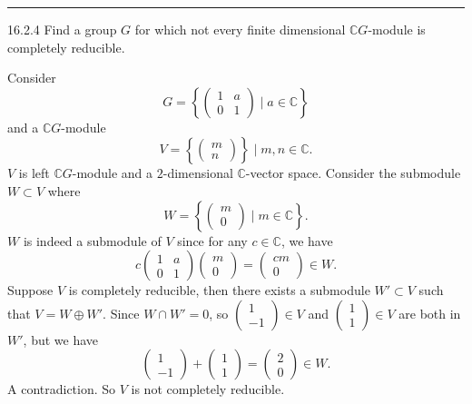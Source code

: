 \documentclass[a4paper, 12pt]{article}
\begin{document}
\noindent\rule{7in}{2.8pt}
\begin{problem}{16.2.4}
Find a group \(G\) for which not every finite dimensional \(\mathbb{C}G\)-module is completely reducible.
\end{problem}
\begin{solution}
Consider 
\[G=\left\{ \begin{pmatrix}
1&a\\ 
0&1
\end{pmatrix}\mid a\in \mathbb{C} \right\}\]
and a \(\mathbb{C}G\)-module 
\[V=\left\{ \begin{pmatrix}
m\\ 
n
\end{pmatrix} \right\}\mid m,n\in \mathbb{C}.\]
\(V\) is left \(\mathbb{C}G\)-module and a \(2\)-dimensional \(\mathbb{C}\)-vector space. Consider the submodule \(W\subset V\) where 
\[W=\left\{ \begin{pmatrix}
m\\ 
0
\end{pmatrix}\mid m\in \mathbb{C} \right\}.\]
\(W\) is indeed a submodule of \(V\) since for any \(c\in \mathbb{C}\), we have 
\[c\begin{pmatrix}
    1&a\\ 
    0&1
\end{pmatrix}\begin{pmatrix}
    m\\ 
    0
\end{pmatrix}=\begin{pmatrix}
    cm\\ 
    0
\end{pmatrix}\in W.\]
Suppose \(V\) is completely reducible, then there exists a submodule \(W'\subset V\) such that \(V=W\oplus W'\). Since \(W\cap W'=0\), so \(\begin{pmatrix}
    1\\ 
    -1
\end{pmatrix}\in V\) and \(\begin{pmatrix}
    1\\ 
    1
\end{pmatrix}\in V\) are both in \(W'\), but we have 
\[\begin{pmatrix}
    1\\ 
    -1
\end{pmatrix}+\begin{pmatrix}
    1\\ 
    1
\end{pmatrix}=\begin{pmatrix}
    2\\
    0
\end{pmatrix}\in W.\]
A contradiction. So \(V\) is not completely reducible.
\end{solution}
\end{document}
